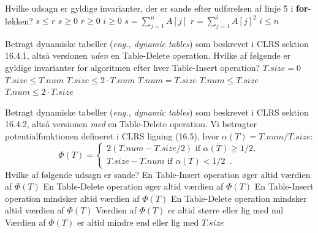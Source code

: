 \noindent
Hvilke udsagn er gyldige invarianter, der er sande efter udførelsen af linje 5 i {\bf for}-løkken?
\fleresvar
\mulighederstart
\svar $s\leq r$
\svar $s\geq 0$
\svar $r\geq 0$ \korrekt
\svar $i\geq 0$ \korrekt
\svar $s = \sum_{j=1}^n A[j]$
\svar $r = \sum_{j=1}^i A[j]^2$ \korrekt
\svar $i \leq n$ \korrekt
\mulighederslut





Betragt dynamiske tabeller (\emph{eng., dynamic tables}) som beskrevet i CLRS sektion 16.4.1, altså versionen \emph{uden} en {\sc Table-Delete} operation.
Hvilke af følgende er gyldige invarianter for algoritmen efter hver {\sc Table-Insert} operation?
\fleresvar
\mulighederstart
\svar $T.size = 0$
\svar $T.size \leq T.num$
\svar $T.size \leq 2\cdot T.num$ \korrekt
\svar $T.num = T.size$
\svar $T.num \leq T.size$ \korrekt
\svar $T.num \leq 2\cdot T.size$ \korrekt
\mulighederslut




Betragt dynamiske tabeller (\emph{eng., dynamic tables}) som beskrevet i CLRS sektion 16.4.2, altså versionen \emph{med} en {\sc Table-Delete} operation.
Vi betragter potentialfunktionen defineret i CLRS ligning (16.5), hvor $\alpha(T) = T.num / T.size$:
\[
\Phi(T) =
\begin{cases}
    2(T.num - T.size/2) \text{ if } \alpha(T) \geq 1/2,\\
    T.size - T.num \text{ if } \alpha(T) < 1/2 \enspace .
\end{cases}
\]
Hvilke af følgende udsagn er sande?
\fleresvar
\mulighederstart
\svar En {\sc Table-Insert} operation øger altid værdien af $\Phi(T)$
\svar En {\sc Table-Delete} operation øger altid værdien af $\Phi(T)$
\svar En {\sc Table-Insert} operation mindsker altid værdien af $\Phi(T)$
\svar En {\sc Table-Delete} operation mindsker altid værdien af $\Phi(T)$
\svar Værdien af $\Phi(T)$ er altid større eller lig med nul \korrekt
\svar Værdien af $\Phi(T)$ er altid mindre end eller lig med $T.size$ \korrekt
\mulighederslut

